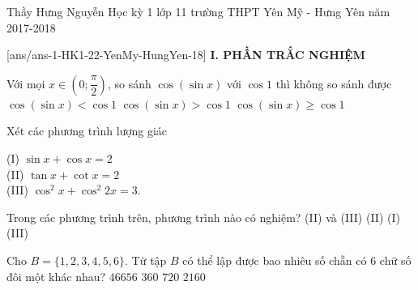 	\begin{name}
		{Thầy Hưng Nguyễn}
		{Học kỳ 1 lớp 11 trường THPT Yên Mỹ - Hưng Yên năm 2017-2018}
	\end{name}
	\setcounter{ex}{0}\setcounter{bt}{0}
	[ans/ans-1-HK1-22-YenMy-HungYen-18]
\noindent\textbf{I. PHẦN TRẮC NGHIỆM}
\begin{ex}%
	Với mọi $x\in\left( 0;\dfrac{\pi}{2}\right)$, so sánh $\cos(\sin x)$ với $\cos 1$ thì
	\choice
	{không so sánh được}
	{$\cos(\sin x)<\cos 1$}
	{\True $\cos(\sin x)>\cos 1$}
	{$\cos(\sin x)\geq\cos 1$}
\end{ex}
\begin{ex}%
	Xét các phương trình lượng giác 
	\begin{multicols}{3}
		(I) $\sin x+\cos x=2$\\
		(II) $\tan x+\cot x=2$\\
		(III) $\cos^2 x+\cos^2 2x=3$.
	\end{multicols}
Trong các phương trình trên, phương trình nào có nghiệm?
	\choice
	{(II) và (III)}
	{\True (II)}
	{(I)}
	{(III)}
\end{ex}
\begin{ex}%
	Cho $B=\{1,2,3,4,5,6\}$. Từ tập $B$ có thể lập được bao nhiêu số chẵn có $6$ chữ số đôi một khác nhau?
	\choice
	{$46656$}
	{\True $360$}
	{$720$}
	{$2160$}
\end{ex}
